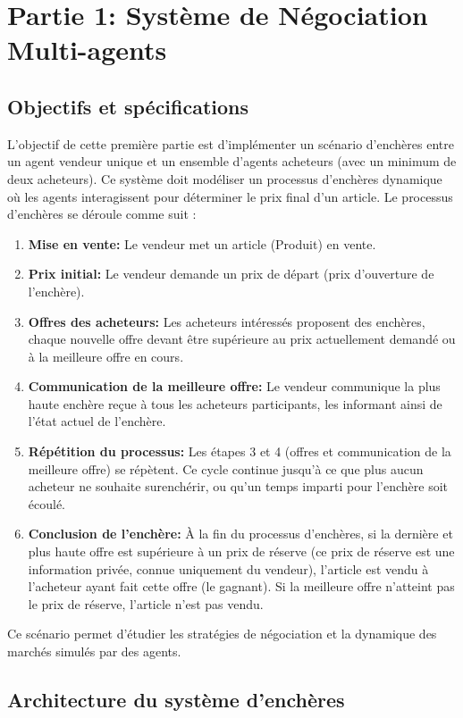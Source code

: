 \documentclass[a4paper,12pt]{report}
\begin{document}
\chapter{Partie 1: Système de Négociation Multi-agents}

\section{Objectifs et spécifications}
L'objectif de cette première partie est d'implémenter un scénario d'enchères entre un agent vendeur unique et un ensemble d'agents acheteurs (avec un minimum de deux acheteurs). Ce système doit modéliser un processus d'enchères dynamique où les agents interagissent pour déterminer le prix final d'un article. Le processus d'enchères se déroule comme suit :
\begin{enumerate}
    \item \textbf{Mise en vente:} Le vendeur met un article (Produit) en vente.
    \item \textbf{Prix initial:} Le vendeur demande un prix de départ (prix d'ouverture de l'enchère).
    \item \textbf{Offres des acheteurs:} Les acheteurs intéressés proposent des enchères, chaque nouvelle offre devant être supérieure au prix actuellement demandé ou à la meilleure offre en cours.
    \item \textbf{Communication de la meilleure offre:} Le vendeur communique la plus haute enchère reçue à tous les acheteurs participants, les informant ainsi de l'état actuel de l'enchère.
    \item \textbf{Répétition du processus:} Les étapes 3 et 4 (offres et communication de la meilleure offre) se répètent. Ce cycle continue jusqu'à ce que plus aucun acheteur ne souhaite surenchérir, ou qu'un temps imparti pour l'enchère soit écoulé.
    \item \textbf{Conclusion de l'enchère:} À la fin du processus d'enchères, si la dernière et plus haute offre est supérieure à un prix de réserve (ce prix de réserve est une information privée, connue uniquement du vendeur), l'article est vendu à l'acheteur ayant fait cette offre (le gagnant). Si la meilleure offre n'atteint pas le prix de réserve, l'article n'est pas vendu.
\end{enumerate}
Ce scénario permet d'étudier les stratégies de négociation et la dynamique des marchés simulés par des agents.

\section{Architecture du système d'enchères}
\end{document}
